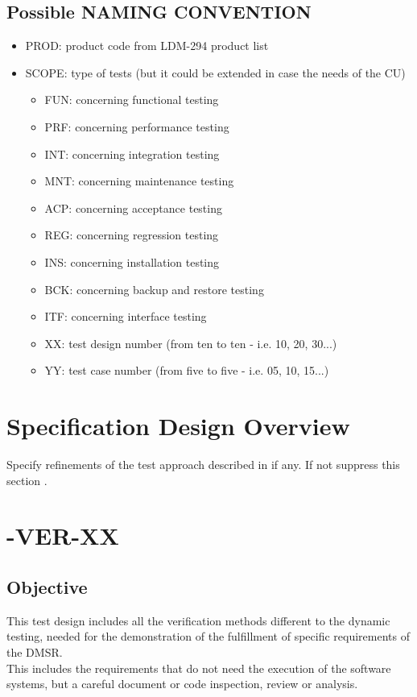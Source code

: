 \documentclass[DM,lsstdraft,STS,toc]{lsstdoc}
\begin{document}
\subsection{ Possible  NAMING CONVENTION}
\begin{itemize}
	\item PROD: product code from LDM-294 product list
	\item SCOPE: type of tests (but it could be extended in case the needs of the CU)
\begin{itemize}
	\item	FUN: concerning functional testing
	\item	PRF: concerning performance testing
	\item	INT: concerning integration testing
	\item	MNT: concerning maintenance testing
	\item 	ACP: concerning acceptance testing
	\item	REG: concerning regression testing
	\item	INS: concerning installation testing
	\item	BCK: concerning backup and restore testing
	\item	ITF: concerning interface testing
	\item XX: test design number (from ten to ten - i.e. 10, 20, 30...)
	\item YY: test case number (from five to five - i.e. 05, 10, 15...)
\end{itemize}
\end{itemize}


\section{Specification Design Overview \label{sect:design}}
Specify refinements of the test approach described in  if any.
If not suppress this section .

\section{\product-VER-XX \label{sect:designid_verification}}

\subsection{Objective \label{sect:designobj}}
This test design includes all the verification methods different to the dynamic testing, needed for the
demonstration of the fulfillment of specific requirements of the DMSR.\\
This includes  the requirements that do not need the execution of the software systems, but a careful document or code inspection, review
or analysis.
\end{document}

